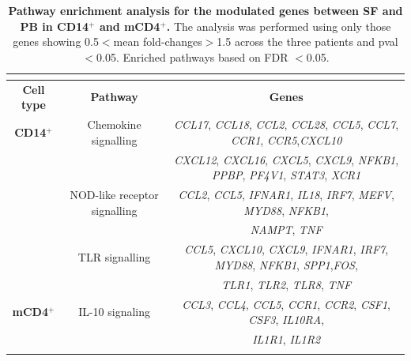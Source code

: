 \begin{landscape}
\begin{center}
\begin{longtable}[ht]{c c c }
\caption[Pathway enrichment analysis for the modulated genes between SF and PB in CD14$^+$ and mCD4$^+$.]{\textbf{Pathway enrichment analysis for the modulated genes between SF and PB in CD14$^+$ and mCD4$^+$.} The analysis was performed using only those genes showing 0.5$<$mean fold-changes$>$1.5 across the three patients and pval$<$0.05. Enriched pathways based on FDR $<$0.05.}
\\
\label{table:PSA_PCR_array_pathway_analysis} \\
\toprule
\textbf{Cell type} & \textbf{Pathway} & \textbf{Genes} \\						
\midrule
\midrule
\textbf{CD14$^+$} & Chemokine signalling & \textit{CCL17}, \textit{CCL18}, \textit{CCL2}, \textit{CCL28}, \textit{CCL5}, \textit{CCL7}, \textit{CCR1}, \textit{CCR5},\textit{CXCL10} \\  
									&                             & \textit{CXCL12}, \textit{CXCL16}, \textit{CXCL5}, \textit{CXCL9}, \textit{NFKB1}, \textit{PPBP}, \textit{PF4V1}, \textit{STAT3}, \textit{XCR1}\\
									
									& NOD-like receptor signalling & \textit{CCL2}, \textit{CCL5}, \textit{IFNAR1}, \textit{IL18}, \textit{IRF7}, \textit{MEFV}, \textit{MYD88}, \textit{NFKB1}, \\
									&                                         & \textit{NAMPT}, \textit{TNF} \\

									& TLR signalling   & \textit{CCL5}, \textit{CXCL10}, \textit{CXCL9}, \textit{IFNAR1}, \textit{IRF7}, \textit{MYD88}, \textit{NFKB1}, \textit{SPP1},\textit{FOS},\\ 
									&                                         & \textit{TLR1}, \textit{TLR2}, \textit{TLR8}, \textit{TNF}\\

\midrule
\textbf{mCD4$^+$} & IL-10 signaling & \textit{CCL3}, \textit{CCL4}, \textit{CCL5}, \textit{CCR1}, \textit{CCR2}, \textit{CSF1}, \textit{CSF3}, \textit{IL10RA}, \\
									&									& \textit{IL1R1}, \textit{IL1R2}\\
\bottomrule
\medskip
\end{longtable}
\end{center}
\end{landscape}

